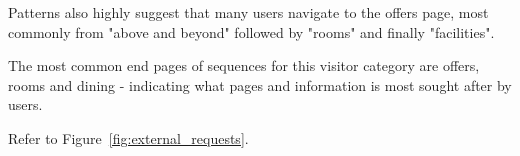 Patterns also highly suggest that many users navigate to the offers page, most commonly from "above and beyond" followed by "rooms" and finally "facilities".

The most common end pages of sequences for this visitor category are offers, rooms and dining - indicating what pages and information is most sought after by users.

Refer to Figure~\ref{fig:external_requests}.

